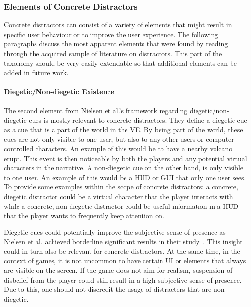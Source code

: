 \subsubsection{Elements of Concrete Distractors}
Concrete distractors can consist of a variety of elements that might result in specific user behaviour or to improve the user experience. The following paragraphs discuss the most apparent elements that were found by reading through the acquired sample of literature on distractors. This part of the taxonomy should be very easily extendable so that additional elements can be added in future work. 

\paragraph{Diegetic/Non-diegetic Existence}
The second element from Nielsen et al.'s framework regarding diegetic/non-diegetic cues is mostly relevant to concrete distractors. They define a diegetic cue as a cue that is a part of the world in the VE. By being part of the world, these cues are not only visible to one user, but also to any other users or computer controlled characters. An example of this would be to have a nearby volcano erupt. This event is then noticeable by both the players and any potential virtual characters in the narrative. A non-diegetic cue on the other hand, is only visible to one user. An example of this would be a HUD or GUI that only one user sees. To provide some examples within the scope of concrete distractors: a concrete, diegetic distractor could be a virtual character that the player interacts with while a concrete, non-diegetic distractor could be useful information in a HUD that the player wants to frequently keep attention on.

Diegetic cues could potentially improve the subjective sense of presence as Nielsen et al. achieved borderline significant results in their study~\cite{nielsen2016missing}. This insight could in turn also be relevant for concrete distractors. At the same time, in the context of games, it is not uncommon to have certain UI or elements that always are visible on the screen. If the game does not aim for realism, suspension of disbelief from the player could still result in a high subjective sense of presence. Due to this, one should not discredit the usage of distractors that are non-diegetic.

